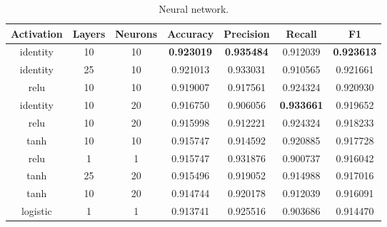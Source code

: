 \begin{appendices}
\begin{table}[ht]
\bigskip
\begin{subtable}{\textwidth}
\begin{adjustbox}{minipage=18cm, center}
\centering
\begin{tabular*}{\textwidth }{c @{\extracolsep{\fill}} cccccc}
\toprule
Activation & Layers & Neurons &  Accuracy &  Precision &    Recall &        F1 \\
\midrule
identity   & 10     &      10 &  \textbf{0.923019} &   \textbf{0.935484} &  0.912039 &  \textbf{0.923613} \\
identity   & 25     &      10 &  0.921013 &   0.933031 &  0.910565 &  0.921661 \\
relu       & 10     &      10 &  0.919007 &   0.917561 &  0.924324 &  0.920930 \\
identity   & 10     &      20 &  0.916750 &   0.906056 &  \textbf{0.933661} &  0.919652 \\
relu       & 10     &      20 &  0.915998 &   0.912221 &  0.924324 &  0.918233 \\
tanh       & 10     &      10 &  0.915747 &   0.914592 &  0.920885 &  0.917728 \\
relu       & 1      &       1 &  0.915747 &   0.931876 &  0.900737 &  0.916042 \\
tanh       & 25     &      20 &  0.915496 &   0.919052 &  0.914988 &  0.917016 \\
tanh       & 10     &      20 &  0.914744 &   0.920178 &  0.912039 &  0.916091 \\
logistic   & 1      &       1 &  0.913741 &   0.925516 &  0.903686 &  0.914470 \\
\bottomrule
\end{tabular*}
\caption{\label{tab:Neural network}Neural network.}
\end{adjustbox}
\end{subtable}
\end{table}
\clearpage
\begin{table}[ht]
\begin{subtable}{\textwidth}
\ContinuedFloat
\begin{adjustbox}{minipage=18cm, center}
\centering
\begin{tabular*}{\textwidth}{c @{\extracolsep{\fill}} ccccc}


\end{tabular*}
\end{adjustbox}
\end{subtable}
\end{table}
\end{appendices}
